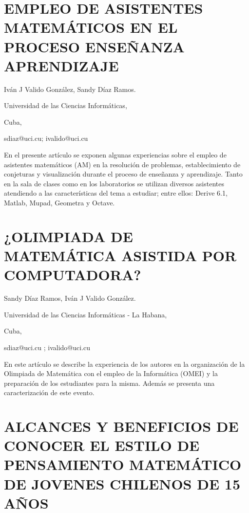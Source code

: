 \section{EMPLEO DE ASISTENTES MATEMÁTICOS EN EL PROCESO ENSEÑANZA APRENDIZAJE}

\begin{datos}

Iván J Valido González, Sandy Díaz Ramos.

Universidad de las Ciencias Informáticas, 

Cuba,

sdiaz@uci.cu; ivalido@uci.cu 

\end{datos}

En el presente artículo se exponen algunas experiencias sobre el empleo
de asistentes matemáticos (AM) en la resolución de problemas, establecimiento
de conjeturas y visualización durante el proceso de enseñanza y aprendizaje.
Tanto en la sala de clases como en los laboratorios se utilizan diversos
asistentes atendiendo a las características del tema a estudiar; entre
ellos: Derive 6.1, Matlab, Mupad, Geometra y Octave. 


\section{¿OLIMPIADA DE MATEMÁTICA ASISTIDA POR COMPUTADORA? }

\begin{datos}

Sandy Díaz Ramos, Iván J Valido González.

Universidad de las Ciencias Informáticas - La Habana, 

Cuba,

sdiaz@uci.cu ; ivalido@uci.cu 

\end{datos}

En este artículo se describe la experiencia de los autores en la organización
de la Olimpiada de Matemática con el empleo de la Informática (OMEI)
y la preparación de los estudiantes para la misma. Además se presenta
una caracterización de este evento.

\setcounter{section}{123}


\section{ALCANCES Y BENEFICIOS DE CONOCER EL ESTILO DE PENSAMIENTO MATEMÁTICO
DE JOVENES CHILENOS DE 15 AÑOS}

